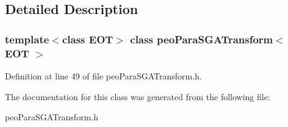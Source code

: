 \subsection{Detailed Description}
\subsubsection*{template$<$class EOT$>$ class peo\-Para\-SGATransform$<$ EOT $>$}





Definition at line 49 of file peo\-Para\-SGATransform.h.

The documentation for this class was generated from the following file:\begin{CompactItemize}
\item 
peo\-Para\-SGATransform.h\end{CompactItemize}
